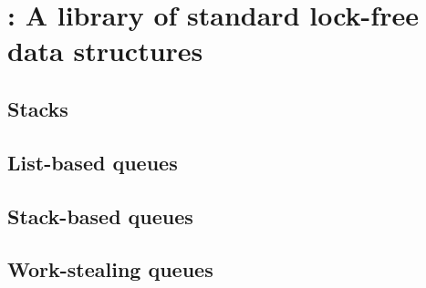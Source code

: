 \section{\Saturn: A library of standard lock-free data structures}
\label{sec:saturn}



\subsection{Stacks}



\subsection{List-based queues}







\subsection{Stack-based queues}




\subsection{Work-stealing queues}
\label{sec:ws_queue}




